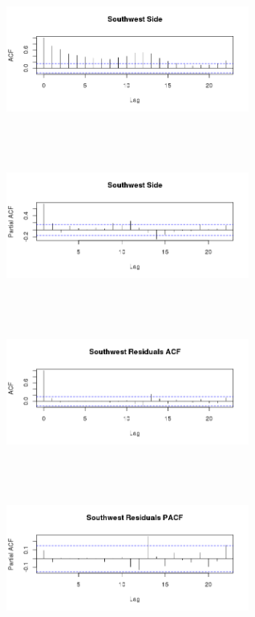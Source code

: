 \documentclass{article} %
\begin{document}
\begin{multicols}{2}
 
\begin{figure}[H]
\includegraphics[height=50mm, width=80mm]{Plots/southwest_acf.png}
\end{figure}
 
\begin{figure}[H]
\includegraphics[height=50mm, width=80mm]{Plots/southwest_PACF.png}
\end{figure}
 
\begin{figure}[H]
\includegraphics[height=50mm, width=80mm]{Plots/southwest_resid_ACF.png}
\end{figure}
 
\begin{figure}[H]
\includegraphics[height=50mm, width=80mm]{Plots/southwest_resid_pacf.png}
\end{figure}
 
\end{multicols}
 
\end{document}
